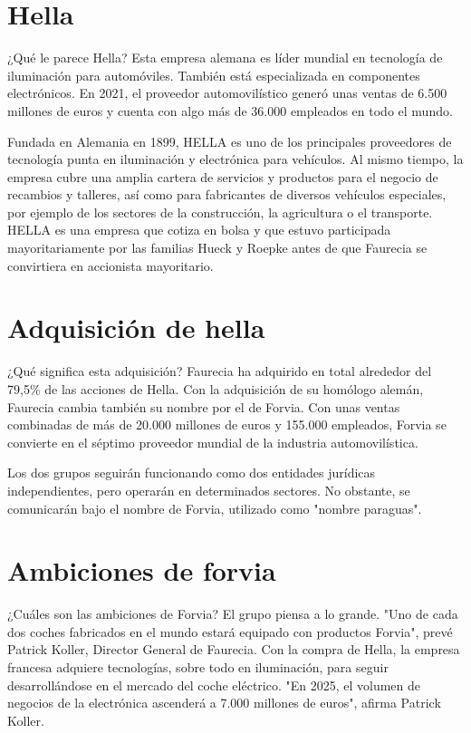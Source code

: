 \documentclass[letterpaper,12pt]{article}
\begin{document}
\begin{sloppypar}
\section*{Hella}
¿Qué le parece Hella?
Esta empresa alemana es líder mundial en tecnología de iluminación para automóviles. También está especializada en componentes electrónicos. En 2021, el proveedor automovilístico generó unas ventas de 6.500 millones de euros y cuenta con algo más de 36.000 empleados en todo el mundo.

Fundada en Alemania en 1899, HELLA es uno de los principales proveedores de tecnología punta en iluminación y electrónica para vehículos. Al mismo tiempo, la empresa cubre una amplia cartera de servicios y productos para el negocio de recambios y talleres, así como para fabricantes de diversos vehículos especiales, por ejemplo de los sectores de la construcción, la agricultura o el transporte. HELLA es una empresa que cotiza en bolsa y que estuvo participada mayoritariamente por las familias Hueck y Roepke antes de que Faurecia se convirtiera en accionista mayoritario.

\section*{Adquisición de hella }
¿Qué significa esta adquisición?
Faurecia ha adquirido en total alrededor del 79,5\% de las acciones de Hella. Con la adquisición de su homólogo alemán, Faurecia cambia también su nombre por el de Forvia. Con unas ventas combinadas de más de 20.000 millones de euros y 155.000 empleados, Forvia se convierte en el séptimo proveedor mundial de la industria automovilística.

Los dos grupos seguirán funcionando como dos entidades jurídicas independientes, pero operarán en determinados sectores. No obstante, se comunicarán bajo el nombre de Forvia, utilizado como "nombre paraguas".



\section*{Ambiciones de forvia}
¿Cuáles son las ambiciones de Forvia?
El grupo piensa a lo grande. "Uno de cada dos coches fabricados en el mundo estará equipado con productos Forvia", prevé Patrick Koller, Director General de Faurecia. Con la compra de Hella, la empresa francesa adquiere tecnologías, sobre todo en iluminación, para seguir desarrollándose en el mercado del coche eléctrico. "En 2025, el volumen de negocios de la electrónica ascenderá a 7.000 millones de euros", afirma Patrick Koller.


\end{sloppypar}
\end{document}
